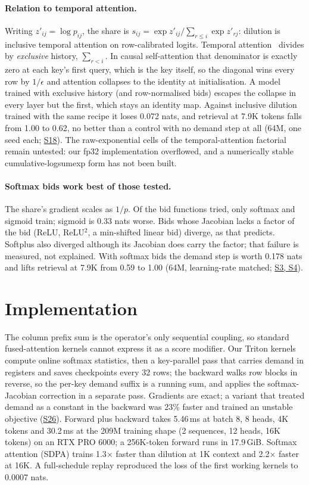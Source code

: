 \documentclass[11pt]{article}
\newcommand{\ledger}[1]{\href{https://github.com/Royer-Research-Labs/Dilution-Attention/blob/main/docs/signals.md}{#1}}
\begin{document}
\paragraph{Relation to temporal attention.} Writing $z'_{ij} = \log p_{ij}$, the share is
$s_{ij} = \exp z'_{ij} / \sum_{r \le i} \exp z'_{rj}$: dilution is inclusive temporal attention on
row-calibrated logits. Temporal attention~\cite{sankaran,paulus} divides by \emph{exclusive} history,
$\sum_{r<i}$. In causal self-attention that denominator is exactly zero at each key's first query,
which is the key itself, so the diagonal wins every row by $1/\epsilon$ and attention collapses to the
identity at initialisation. A model trained with exclusive history (and row-normalised bids) escapes
the collapse in every layer but the first, which stays an identity map. Against inclusive dilution
trained with the same recipe it loses 0.072 nats, and retrieval at 7.9K tokens falls from 1.00 to
0.62, no better than a control with no demand step at all (64M, one seed each; \ledger{S18}). The
raw-exponential cells of the temporal-attention factorial remain untested: our fp32 implementation
overflowed, and a numerically stable cumulative-logsumexp form has not been built.

\paragraph{Softmax bids work best of those tested.} The share's gradient scales as $1/p$. Of the bid functions
tried, only softmax and sigmoid train; sigmoid is 0.33 nats worse. Bids whose Jacobian lacks a factor
of the bid (ReLU, ReLU$^2$, a min-shifted linear bid) diverge, as that predicts. Softplus also
diverged although its Jacobian does carry the factor; that failure is measured, not explained. With
softmax bids the demand step is worth 0.178 nats and lifts retrieval at 7.9K from 0.59 to 1.00
(64M, learning-rate matched; \ledger{S3, S4}).

\section{Implementation}

The column prefix sum is the operator's only sequential coupling, so standard fused-attention
kernels cannot express it as a score modifier. Our Triton kernels compute online softmax statistics,
then a key-parallel pass that carries demand in registers and saves checkpoints every 32 rows; the
backward walks row blocks in reverse, so the per-key demand suffix is a running sum, and applies the
softmax-Jacobian correction in a separate pass. Gradients are exact; a variant that treated demand as
a constant in the backward was 23\% faster and trained an unstable objective (\ledger{S26}). Forward
plus backward takes 5.46\,ms at batch 8, 8 heads, 4K tokens and 30.2\,ms at the 209M training shape
(2 sequences, 12 heads, 16K tokens) on an RTX PRO 6000; a 256K-token forward runs in 17.9\,GiB.
Softmax attention (SDPA) trains 1.3$\times$ faster than dilution at 1K context and 2.2$\times$ faster at
16K. A full-schedule replay reproduced the loss of the first working kernels to 0.0007 nats.
\end{document}
